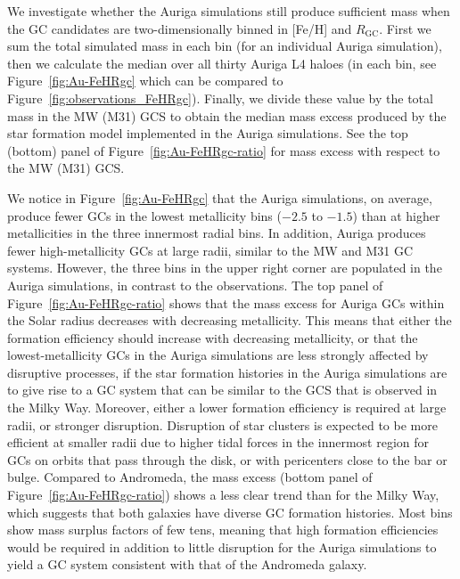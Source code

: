 \documentclass[a4paper,fleqn,usenatbib]{mnras}
\begin{document}
We investigate whether the Auriga simulations still produce sufficient mass when
the GC candidates are two-dimensionally binned in [Fe/H] and $R_\text{GC}$. First
we sum the total simulated mass in each bin (for an individual Auriga simulation),
then we calculate the median over all thirty Auriga L4 haloes (in each bin, see
Figure~\ref{fig:Au-FeHRgc} which can be compared to
Figure~\ref{fig:observations_FeHRgc}). Finally, we divide these value by the total
mass in the MW (M31) GCS to obtain the median mass excess produced by the star
formation model implemented in the Auriga simulations. See the top (bottom) panel
of Figure~\ref{fig:Au-FeHRgc-ratio} for mass excess with respect to the MW (M31) GCS.

We notice in Figure~\ref{fig:Au-FeHRgc} that the Auriga simulations, on average,
produce fewer GCs in the lowest metallicity bins ($-2.5$ to $-1.5$) than at higher 
metallicities in the three innermost radial bins. In addition, Auriga produces 
fewer high-metallicity GCs at large radii, similar to the MW and M31 GC systems. 
However, the three bins in the upper right corner are populated in the Auriga
simulations, in contrast to the observations. The top panel of 
Figure~\ref{fig:Au-FeHRgc-ratio} shows that the mass excess for Auriga GCs within
the Solar radius decreases with decreasing metallicity. This means that either
the formation efficiency should increase with decreasing metallicity, or that 
the lowest-metallicity GCs in the Auriga simulations are less strongly affected
by disruptive processes, if the star formation histories in the Auriga simulations
are to give rise to a GC system that can be similar to the GCS that is observed
in the Milky Way. Moreover, either a lower formation efficiency is required at
large radii, or stronger disruption. Disruption of star clusters is expected to
be more efficient at smaller radii due to higher tidal forces in the innermost
region for GCs on orbits that pass through the disk, or with pericenters close 
to the bar or bulge. Compared to Andromeda, the mass excess (bottom panel of 
Figure~\ref{fig:Au-FeHRgc-ratio}) shows a less clear trend than for the Milky Way,
which suggests that both galaxies have diverse GC formation histories.
Most bins show mass surplus factors of few tens, meaning that high formation 
efficiencies would be required in addition to little disruption for the Auriga 
simulations to yield a GC system consistent with that of the Andromeda galaxy.
\end{document}
